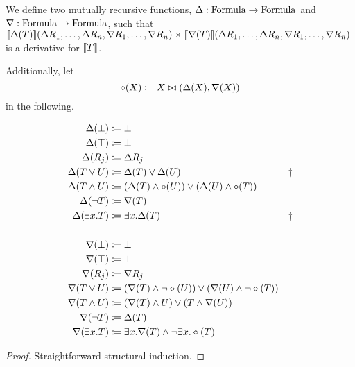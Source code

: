 \newcommand{\bothchanges}{\rho}
\begin{thm}
\label{thm:concreteDatalog}
  We define two mutually recursive functions,
  $\Delta: \mathrm{Formula} \rightarrow \mathrm{Formula}$ and
  $\nabla: \mathrm{Formula} \rightarrow \mathrm{Formula}$, such
  that
  $\llbracket \Delta(T) \rrbracket(\Delta R_1, \dots, \Delta R_n, \nabla R_1, \dots, \nabla R_n)
  \times
  \llbracket \nabla(T) \rrbracket(\Delta R_1, \dots, \Delta R_n, \nabla R_1, \dots, \nabla R_n)$
  is a derivative for $\llbracket T \rrbracket$.

  Additionally, let
  \begin{displaymath}
    \diamond(X) \coloneqq X \bowtie (\Delta(X), \nabla(X))
  \end{displaymath}
  in the following.

  \begin{align*}
  \Delta(\bot) &\coloneqq \bot\\
  \Delta(\top) &\coloneqq \bot\\
  \Delta(R_j) &\coloneqq \Delta R_j \\
  \Delta(T\vee U) &\coloneqq \Delta(T) \vee \Delta (U) &\dagger\\
  \Delta(T\wedge U) &\coloneqq (\Delta(T)\wedge \diamond(U))
                           \vee
                           (\Delta(U) \wedge \diamond(T))\\
  \Delta(\neg T) &\coloneqq \nabla(T)\\
  \Delta(\exists x.T) &\coloneqq \exists x.\Delta(T) &\dagger\\
    \\
  \nabla(\bot) &\coloneqq \bot\\
  \nabla(\top) &\coloneqq \bot\\
  \nabla(R_j) &\coloneqq \nabla R_j \\
  \nabla(T\vee U) &\coloneqq (\nabla(T) \wedge \neg \diamond(U))
                           \vee
                           (\nabla(U) \wedge \neg \diamond(T))\\
  \nabla(T\wedge U) &\coloneqq (\nabla(T)\wedge U) \vee (T \wedge \nabla(U))\\
  \nabla(\neg T) &\coloneqq \Delta(T)\\
  \nabla(\exists x.T) &\coloneqq \exists x.\nabla(T) \wedge \neg \exists x.\diamond(T)
  \end{align*}
\end{thm}
\ifproofs
\begin{proof}
  Straightforward structural induction.
\end{proof}
\fi

